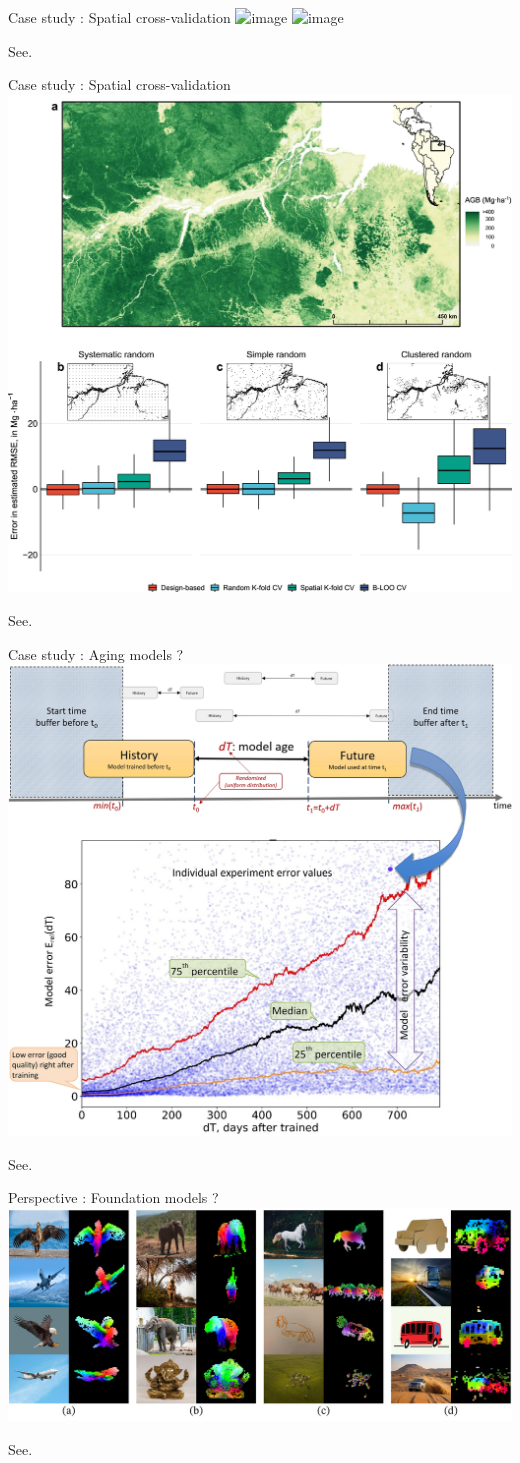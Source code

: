 \documentclass{irdbeamer}
\let\oldcite=\cite
\renewcommand{\cite}[1]{\textcolor[rgb]{.5,.5,.7}{\oldcite{#1}}}
\begin{document}
\begin{frame}{Case study : Spatial cross-validation}
    \centering
    \includegraphics<1>[width=.5\textwidth]{./figs/spatial/ploton2020.png}%
    \includegraphics<2>[width=.5\textwidth]{./figs/spatial/ploton2020-result.png}%
    
    \tiny See. \cite{ploton2020spatial}
\end{frame}

\begin{frame}{Case study : Spatial cross-validation}
    \centering
    \includegraphics[width=.4\textwidth]{./figs/spatial/wadoux2021.jpg}%
    
    \tiny See. \cite{wadoux2021spatial}
\end{frame}

\begin{frame}{Case study : Aging models ?}
    \centering
    \includegraphics[width=.4\textwidth]{./figs/temporal/41598_2022_15245_Fig2_HTML.png}%
    
    \tiny See. \cite{vela2022temporal}
    
\end{frame}


\begin{frame}{Perspective : Foundation models ?}
    \centering
    \includegraphics[width=.7\textwidth]{./figs/dinov2_pca.png}%
    
    \tiny See. \cite{oquab2023dinov2}
\end{frame}
\end{document}
